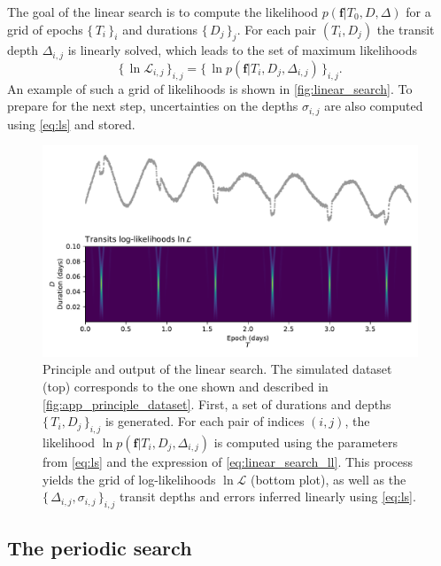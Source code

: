 \documentclass[modern]{aastex631}
\newcommand{\set}[1]{\{\,#1\,\}}
\begin{document}
The goal of the linear search is to compute the likelihood $p(\bm{f} \vert T_0 , D, \Delta)$ for a grid of epochs $\set{T_i}_i$ and durations $\set{D_j}_j$. For each pair $(T_i, D_j)$ the transit depth $\Delta_{i, j}$ is linearly solved, which leads to the set of maximum likelihoods
\begin{equation*}
    \set{\ln\mathcal{L}_{i,j}}_{i, j} = \set{\ln p(\bm{f} \vert T_i ,D_j, \Delta_{i, j})}_{i, j}.
\end{equation*}
An example of such a grid of likelihoods is shown in \autoref{fig:linear_search}. To prepare for the next step, uncertainties on the depths $\sigma_{i,j}$ are also computed using \autoref{eq:ls} and stored.
\begin{figure}[H]
    \begin{centering}
        \includegraphics[width=\linewidth]{../workflows/principle/figures/principle_linear_search.pdf}
        \caption{Principle and output of the linear search. The simulated dataset (top) corresponds to the one shown and described in \autoref{fig:app_principle_dataset}. First, a set of durations and depths $\set{T_i, D_j}_{i,j}$ is generated. For each pair of indices $(i,j)$, the likelihood $\ln p(\bm{f} \vert T_i ,D_j, \Delta_{i,j})$ is computed using the parameters from \autoref{eq:ls} and the expression of \autoref{eq:linear_search_ll}. This process yields the grid of log-likelihoods $\ln\mathcal{L}$ (bottom plot), as well as the $\set{\Delta_{i,j}, \sigma_{i,j}}_{i, j}$ transit depths and errors inferred linearly using \autoref{eq:ls}.}
        \label{fig:linear_search}
    \end{centering}
\end{figure}

\subsection{The periodic search}\label{periodic_search}
\end{document}
